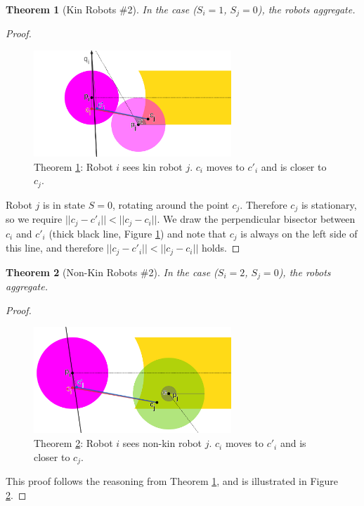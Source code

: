 \documentclass[letterpaper, 10 pt, conference]{ieeeconf}
\newtheorem{theorem}{Theorem}
\begin{document}
  \begin{theorem}[Kin Robots \#2]\label{thm:kin_2}
    In the case ($S_i=1$, $S_j=0$), the robots aggregate.
  \end{theorem}
  \begin{proof}
    \begin{figure}[t]
      \centering
      \includegraphics[height=4cm]{./images/kin_2.png}
      \caption{Theorem \ref{thm:kin_2}: Robot $i$ sees kin robot $j$. $c_i$ moves to $c'_i$ and is closer to $c_j$.}
      \label{fig:kin_2}
    \end{figure}

    Robot $j$ is in state $S=0$, rotating around the point $c_j$. Therefore $c_j$ is stationary, so we require $||c_j- c'_i|| < ||c_j- c_i||$. We draw the perpendicular bisector between $c_i$ and $c'_i$ (thick black line, Figure \ref{fig:kin_2}) and note that $c_j$ is always on the left side of this line, and therefore $||c_j- c'_i|| < ||c_j- c_i||$ holds.
  \end{proof}

  \begin{theorem}[Non-Kin Robots \#2]\label{thm:non_kin_2}
    In the case ($S_i=2$, $S_j=0$), the robots aggregate.
  \end{theorem}
  \begin{proof}
    \begin{figure}[t]
      \centering
      \includegraphics[height=4cm]{./images/non_kin_2.png}
      \caption{Theorem \ref{thm:non_kin_2}: Robot $i$ sees non-kin robot $j$. $c_i$ moves to $c'_i$ and is closer to $c_j$.}
      \label{fig:non_kin_2}
    \end{figure}

    This proof follows the reasoning from Theorem \ref{thm:kin_2}, and is illustrated in Figure \ref{fig:non_kin_2}.
  \end{proof}
\end{document}
